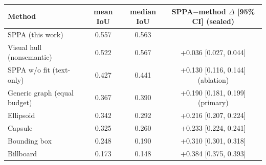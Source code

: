 \begin{tabular}{lccc}
\toprule
Method & mean IoU & median IoU & SPPA$-$method $\Delta$ [95\% CI] (sealed) \\
\midrule
SPPA (this work) & 0.557 & 0.563 &  \\
Visual hull (nonsemantic) & 0.522 & 0.567 & +0.036 [0.027, 0.044] \\
SPPA w/o fit (text-only) & 0.427 & 0.441 & +0.130 [0.116, 0.144] (ablation) \\
Generic graph (equal budget) & 0.367 & 0.390 & +0.190 [0.181, 0.199] (primary) \\
Ellipsoid & 0.342 & 0.292 & +0.216 [0.207, 0.224] \\
Capsule & 0.325 & 0.260 & +0.233 [0.224, 0.241] \\
Bounding box & 0.248 & 0.190 & +0.310 [0.301, 0.318] \\
Billboard & 0.173 & 0.148 & +0.384 [0.375, 0.393] \\
\bottomrule
\end{tabular}
